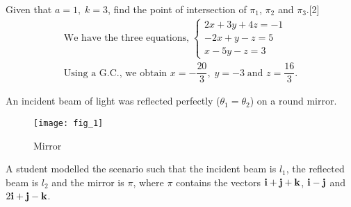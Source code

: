 \documentclass[12pt, a4 paper]{article}
\begin{document}
\begin{outline}[enumerate]
					\color{black}
					\2 Given that $a = 1,\;k = 3$, find the point of intersection of ${\pi _1}$, ${\pi _2}$ and ${\pi _3}$.\hfill[2]
					\color{blue}
					\[\begin{array}{l}{\textrm{We have the three equations,}}\;\left\{ \begin{array}{l}2x + 3y + 4z =  - 1\\ - 2x + y - z = 5\\x - 5y - z = 3\end{array} \right.\\{\textrm{Using a G}}{\textrm{.C}}{\textrm{., we obtain }}x =  - \dfrac{{20}}{3},\;y =  - 3\;{\textrm{and }}z = \dfrac{{16}}{3}.\end{array}\]
					\color{black}

					\1 An incident beam of light was reflected perfectly (${\theta _1} = {\theta _2}$) on a round mirror.

					\begin{figure}[h]
						\centering
						\texttt{[image: fig\_1]}
						\caption{Mirror}
					\end{figure}

					A student modelled the scenario such that the incident beam is ${l_1}$, the reflected beam is ${l_2}$ and the mirror is $\pi $, where $\pi $ contains the vectors ${\bf{i}} + {\bf{j}} + {\bf{k}}$, ${\bf{i}} - {\bf{j}}$ and $2{\bf{i}} + {\bf{j}} - {\bf{k}}$.


\end{outline}
\end{document}

